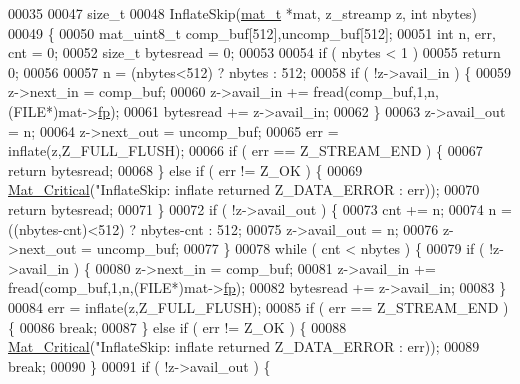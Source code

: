 \begin{DoxyCode}
00035 
00047 \textcolor{keywordtype}{size\_t}
00048 InflateSkip(\hyperlink{struct__mat__t}{mat\_t} *mat, z\_streamp z, \textcolor{keywordtype}{int} nbytes)
00049 \{
00050     mat\_uint8\_t comp\_buf[512],uncomp\_buf[512];
00051     \textcolor{keywordtype}{int}    n, err, cnt = 0;
00052     \textcolor{keywordtype}{size\_t} bytesread = 0;
00053 
00054     \textcolor{keywordflow}{if} ( nbytes < 1 )
00055         \textcolor{keywordflow}{return} 0;
00056 
00057     n = (nbytes<512) ? nbytes : 512;
00058     \textcolor{keywordflow}{if} ( !z->avail\_in ) \{
00059         z->next\_in = comp\_buf;
00060         z->avail\_in += fread(comp\_buf,1,n,(FILE*)mat->\hyperlink{struct__mat__t_a85f562e407ca9ad4d2a6e14f839432b7}{fp});
00061         bytesread   += z->avail\_in;
00062     \}
00063     z->avail\_out = n;
00064     z->next\_out  = uncomp\_buf;
00065     err = inflate(z,Z\_FULL\_FLUSH);
00066     \textcolor{keywordflow}{if} ( err == Z\_STREAM\_END ) \{
00067         \textcolor{keywordflow}{return} bytesread;
00068     \} \textcolor{keywordflow}{else} \textcolor{keywordflow}{if} ( err != Z\_OK ) \{
00069         \hyperlink{group__mat__util_gaf51f2bfbb5580f575e4dd79757e2b80c}{Mat\_Critical}(\textcolor{stringliteral}{"InflateSkip: inflate returned %
      Z\_DATA\_ERROR : err));
00070         \textcolor{keywordflow}{return} bytesread;
00071     \}
00072     \textcolor{keywordflow}{if} ( !z->avail\_out ) \{
00073         cnt += n;
00074         n = ((nbytes-cnt)<512) ? nbytes-cnt : 512;
00075         z->avail\_out = n;
00076         z->next\_out  = uncomp\_buf;
00077     \}
00078     \textcolor{keywordflow}{while} ( cnt < nbytes ) \{
00079         \textcolor{keywordflow}{if} ( !z->avail\_in ) \{
00080             z->next\_in   = comp\_buf;
00081             z->avail\_in += fread(comp\_buf,1,n,(FILE*)mat->\hyperlink{struct__mat__t_a85f562e407ca9ad4d2a6e14f839432b7}{fp});
00082             bytesread   += z->avail\_in;
00083         \}
00084         err = inflate(z,Z\_FULL\_FLUSH);
00085         \textcolor{keywordflow}{if} ( err == Z\_STREAM\_END ) \{
00086             \textcolor{keywordflow}{break};
00087         \} \textcolor{keywordflow}{else} \textcolor{keywordflow}{if} ( err != Z\_OK ) \{
00088             \hyperlink{group__mat__util_gaf51f2bfbb5580f575e4dd79757e2b80c}{Mat\_Critical}(\textcolor{stringliteral}{"InflateSkip: inflate returned %
      Z\_DATA\_ERROR : err));
00089             \textcolor{keywordflow}{break};
00090         \}
00091         \textcolor{keywordflow}{if} ( !z->avail\_out ) \{
}}
\end{DoxyCode}
